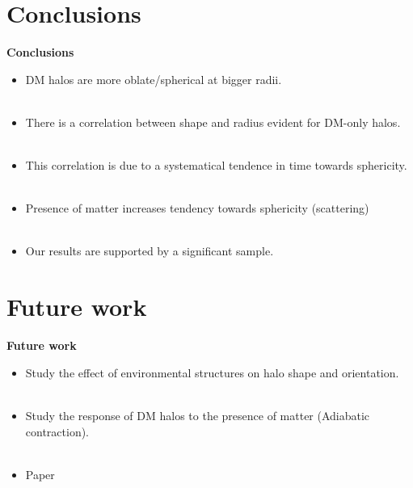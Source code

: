 \documentclass[xcolor=dvipsnames]{beamer}
\begin{document}
\section{Conclusions}
\begin{frame}
\centering
\LARGE
\textbf{Conclusions}
\normalsize
\end{frame}

\begin{frame}

\begin{itemize}

\item DM halos are more oblate/spherical at bigger radii.\\~\\

\item There is a correlation between shape and radius evident for DM-only halos.\\~\\

\item This correlation is due to a systematical tendence in time towards sphericity.\\~\\

\item Presence of matter increases tendency towards sphericity (scattering) \\~\\

\item Our results are supported by a significant sample.

\end{itemize}

\end{frame}

\section{Future work}
\begin{frame}
\centering
\LARGE
\textbf{Future work}
\normalsize
\end{frame}

\begin{frame}

\begin{itemize}

\item Study the effect of environmental structures on halo shape and orientation.\\~\\

\item Study the response of DM halos to the presence of matter (Adiabatic contraction).\\~\\

\item Paper

\end{itemize}

\end{frame}
\end{document}
